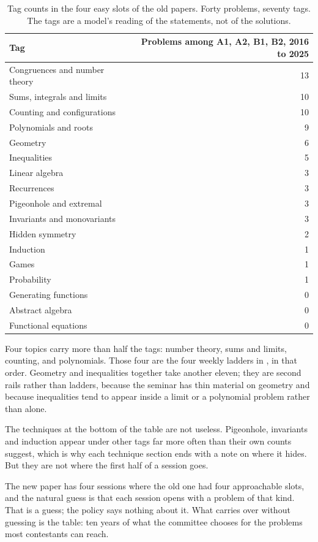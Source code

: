 \begin{table}[ht]
\centering
\small
\begin{tabular}{lr}
\toprule
Tag & Problems among A1, A2, B1, B2, 2016 to 2025 \\
\midrule
Congruences and number theory & 13 \\
Sums, integrals and limits & 10 \\
Counting and configurations & 10 \\
Polynomials and roots & 9 \\
Geometry & 6 \\
Inequalities & 5 \\
Linear algebra & 3 \\
Recurrences & 3 \\
Pigeonhole and extremal & 3 \\
Invariants and monovariants & 3 \\
Hidden symmetry & 2 \\
Induction & 1 \\
Games & 1 \\
Probability & 1 \\
Generating functions & 0 \\
Abstract algebra & 0 \\
Functional equations & 0 \\
\bottomrule
\end{tabular}
\caption{Tag counts in the four easy slots of the old papers. Forty problems, seventy tags. The tags are a model's reading of the statements, not of the solutions.}
\label{tab:tags}
\end{table}

Four topics carry more than half the tags: number theory, sums and limits, counting, and polynomials. Those four are the four weekly ladders in , in that order. Geometry and inequalities together take another eleven; they are second rails rather than ladders, because the seminar has thin material on geometry and because inequalities tend to appear inside a limit or a polynomial problem rather than alone.

The techniques at the bottom of the table are not useless. Pigeonhole, invariants and induction appear under other tags far more often than their own counts suggest, which is why each technique section ends with a note on where it hides. But they are not where the first half of a session goes.

The new paper has four sessions where the old one had four approachable slots, and the natural guess is that each session opens with a problem of that kind. That is a guess; the policy says nothing about it. What carries over without guessing is the table: ten years of what the committee chooses for the problems most contestants can reach.

